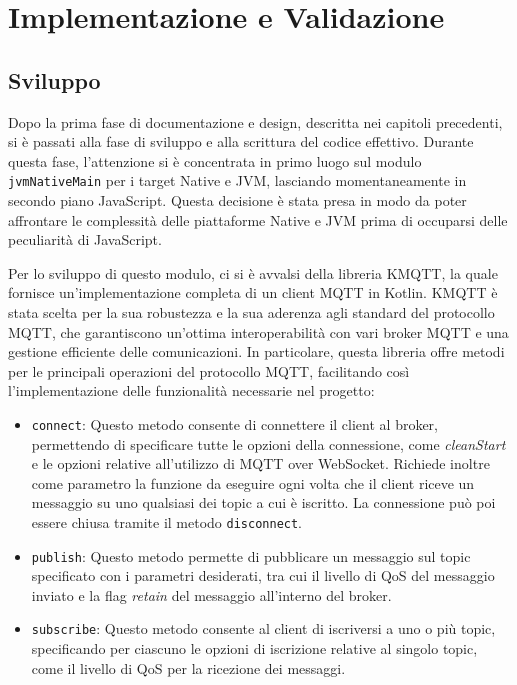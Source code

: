 \documentclass[12pt,a4paper,openright,twoside]{book}
\begin{document}
\chapter{Implementazione e Validazione}\label{chap:Implementazione e Validazione} 

\section{Sviluppo} 

Dopo la prima fase di documentazione e design, descritta nei capitoli precedenti, si è passati alla fase di sviluppo e alla scrittura del codice effettivo. 
Durante questa fase, l'attenzione si è concentrata in primo luogo sul modulo \texttt{jvmNativeMain} per i target Native e \ac{JVM}, lasciando momentaneamente 
in secondo piano JavaScript. Questa decisione è stata presa in modo da poter affrontare le complessità delle piattaforme Native e JVM prima di occuparsi delle 
peculiarità di JavaScript.

Per lo sviluppo di questo modulo, ci si è avvalsi della libreria KMQTT, la quale fornisce un'implementazione completa di un client \ac{MQTT} in Kotlin. 
KMQTT è stata scelta per la sua robustezza e la sua aderenza agli standard del protocollo \ac{MQTT}, che garantiscono un'ottima interoperabilità con vari 
broker MQTT e una gestione efficiente delle comunicazioni. In particolare, questa libreria offre metodi per le principali operazioni del protocollo \ac{MQTT},
facilitando così l'implementazione delle funzionalità necessarie nel progetto:
\begin{itemize}
    \item \texttt{connect}: Questo metodo consente di connettere il client al broker, permettendo di specificare tutte le opzioni della connessione, 
    come \textit{cleanStart} e le opzioni relative all'utilizzo di \ac{MQTT} over WebSocket. Richiede inoltre come parametro la funzione da eseguire 
    ogni volta che il client riceve un messaggio su uno qualsiasi dei topic a cui è iscritto. La connessione può poi essere chiusa tramite il metodo \texttt{disconnect}.

    \item \texttt{publish}: Questo metodo permette di pubblicare un messaggio sul topic specificato con i parametri desiderati, tra cui il livello di 
    \ac{QoS} del messaggio inviato e la flag \textit{retain} del messaggio all'interno del broker.

    \item \texttt{subscribe}: Questo metodo consente al client di iscriversi a uno o più topic, specificando per ciascuno le opzioni di iscrizione relative 
    al singolo topic, come il livello di \ac{QoS} per la ricezione dei messaggi.
\end{itemize}
\end{document}
